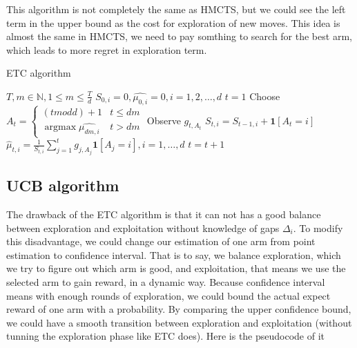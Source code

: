 \documentclass[a4paper, 11pt]{article} %
\begin{document}
\begin{multicols}{2}
		This algorithm is not completely the same as HMCTS, but we could see the left term in the upper bound as the cost for exploration of new moves. This idea is almost the same in HMCTS, we need to pay somthing to search for the best arm, which leads to more regret in exploration term.
		
		\begin{algorithm}[H]
			\caption{ETC algorithm}
			\begin{algorithmic}[1]
				\Require $T, m \in \mathbb{N}, 1 \leq m \leq \frac{T}{d}$
				\State $S_{0, i} = 0, \hat{\mu_{0, i}} = 0, i = 1, 2, \ldots, d$
				\State $t = 1$
				\State Choose $A_t = \begin{cases}
					(t mod d) + 1 & t \leq dm \\
					\mathop{\arg \max} \hat{\mu_{dm, i}} & t > dm
				\end{cases}$
				\State Observe $g_{t, A_t}$
				\State $S_{t, i} = S_{t - 1, i} + \mathbf{1}[A_t = i]$
				\State $\hat{\mu}_{t, i}=\frac{1}{S_{t, i}} \sum_{j=1}^{t} g_{j, A_{j}} \mathbf{1}\left[A_{j}=i\right], i=1, \ldots, d $
				\State $t = t + 1$
				\EndFor
			\end{algorithmic}
		\end{algorithm}
		
		\subsection{UCB algorithm}
		
		The drawback of the ETC algorithm is that it can not has a good balance between exploration and exploitation without knowledge of gaps $\Delta_i$. To modify this disadvantage, we could change our estimation of one arm from point estimation to confidence interval. That is to say, we balance exploration, which we try to figure out which arm is good, and exploitation, that means we use the selected arm to gain reward, in a dynamic way. Because confidence interval means with enough rounds of exploration, we could bound the actual expect reward of one arm with a probability. By comparing the upper confidence bound, we could have a smooth transition between exploration and exploitation (without tunning the exploration phase like ETC does). Here is the pseudocode of it
		

\end{multicols}
\end{document}
